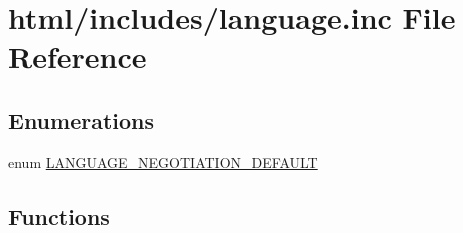 \hypertarget{includes_2language_8inc}{
\section{html/includes/language.inc File Reference}
\label{includes_2language_8inc}
}
\subsection*{Enumerations}
\begin{DoxyCompactItemize}
\item 
enum \hyperlink{includes_2language_8inc_a62b928f1b1b803ed9be8ecaa376867b2}{LANGUAGE\_\-NEGOTIATION\_\-DEFAULT} 
\end{DoxyCompactItemize}
\subsection*{Functions}

